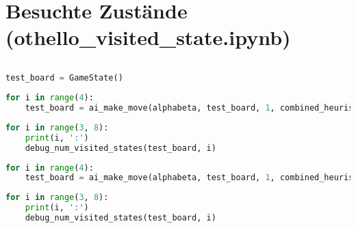 \hypertarget{besuchte-zustuxe4nde-othello_visited_state.ipynb}{%
\section{Besuchte Zustände
(othello\_visited\_state.ipynb)}\label{besuchte-zustuxe4nde-othello_visited_state.ipynb}}

\begin{lstlisting}[language=Python]
%run othello_test_util.ipynb
\end{lstlisting}

\begin{lstlisting}[language=Python]
test_board = GameState()
\end{lstlisting}

\begin{lstlisting}[language=Python]
for i in range(4):
    test_board = ai_make_move(alphabeta, test_board, 1, combined_heuristic)
\end{lstlisting}

\begin{lstlisting}[language=Python]
for i in range(3, 8):
    print(i, ':')
    debug_num_visited_states(test_board, i)
\end{lstlisting}

\begin{lstlisting}[language=Python]
for i in range(4):
    test_board = ai_make_move(alphabeta, test_board, 1, combined_heuristic)
\end{lstlisting}

\begin{lstlisting}[language=Python]
for i in range(3, 8):
    print(i, ':')
    debug_num_visited_states(test_board, i)
\end{lstlisting}
